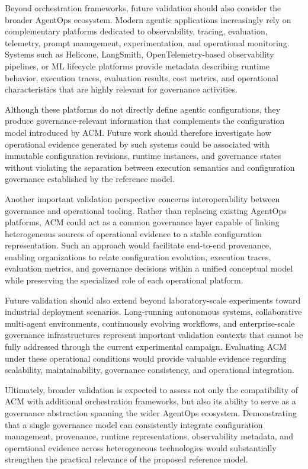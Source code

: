 \documentclass[10pt]{article}
\begin{document}
Beyond orchestration frameworks, future validation should also consider the broader AgentOps ecosystem. Modern agentic applications increasingly rely on complementary platforms dedicated to observability, tracing, evaluation, telemetry, prompt management, experimentation, and operational monitoring. Systems such as Helicone, LangSmith, OpenTelemetry-based observability pipelines, or ML lifecycle platforms provide metadata describing runtime behavior, execution traces, evaluation results, cost metrics, and operational characteristics that are highly relevant for governance activities.

Although these platforms do not directly define agentic configurations, they produce governance-relevant information that complements the configuration model introduced by ACM. Future work should therefore investigate how operational evidence generated by such systems could be associated with immutable configuration revisions, runtime instances, and governance states without violating the separation between execution semantics and configuration governance established by the reference model.

Another important validation perspective concerns interoperability between governance and operational tooling. Rather than replacing existing AgentOps platforms, ACM could act as a common governance layer capable of linking heterogeneous sources of operational evidence to a stable configuration representation. Such an approach would facilitate end-to-end provenance, enabling organizations to relate configuration evolution, execution traces, evaluation metrics, and governance decisions within a unified conceptual model while preserving the specialized role of each operational platform.

Future validation should also extend beyond laboratory-scale experiments toward industrial deployment scenarios. Long-running autonomous systems, collaborative multi-agent environments, continuously evolving workflows, and enterprise-scale governance infrastructures represent important validation contexts that cannot be fully addressed through the current experimental campaign. Evaluating ACM under these operational conditions would provide valuable evidence regarding scalability, maintainability, governance consistency, and operational integration.

Ultimately, broader validation is expected to assess not only the compatibility of ACM with additional orchestration frameworks, but also its ability to serve as a governance abstraction spanning the wider AgentOps ecosystem. Demonstrating that a single governance model can consistently integrate configuration management, provenance, runtime representations, observability metadata, and operational evidence across heterogeneous technologies would substantially strengthen the practical relevance of the proposed reference model.
\end{document}
